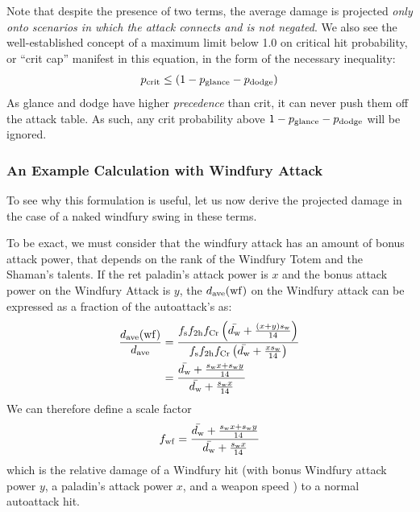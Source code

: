 Note that despite the presence of two \pdodge terms, the average damage is projected \emph{only onto scenarios in which the attack connects and is not negated}.
We also see the well-established concept of a maximum limit below 1.0 on critical hit probability, or ``crit cap'' manifest in this equation, in the form of the necessary inequality:
\begin{equation}
	p_{\mathrm{crit}}  \leq (1-p_{\mathrm{glance}}  - p_{\mathrm{dodge}} )
\end{equation}
As glance and dodge have higher \emph{precedence} than crit, it can never push them off the attack table.
As such, any crit probability above $1 - p_{\mathrm{glance}}  - p_{\mathrm{dodge}} $ will be ignored.

\subsubsection{An Example Calculation with Windfury Attack}
To see why this formulation is useful, let us now derive the projected damage in the case of a naked windfury swing in these terms.

To be exact, we must consider that the windfury attack has an amount of bonus attack power, that depends on the rank of the Windfury Totem and the Shaman's talents.
If the ret paladin's attack power is $x$ and the bonus attack power on the Windfury Attack is $y$, the $d_{\mathrm{ave}} (\mathrm{wf})$ on the Windfury attack can be expressed as a fraction of the autoattack's \dave as:
\begin{equation*}
	\begin{aligned}
		\frac{d_{\mathrm{ave}} (\mathrm{wf})}{d_{\mathrm{ave}} } &= \frac{f_{\mathrm{s}}  f_{\mathrm{2h}}  f_{\mathrm{Cr}}  \left( \bar{d_\mathrm{w}}  + \frac{(x+y)s_\mathrm{w} }{14} \right)}{f_{\mathrm{s}}  f_{\mathrm{2h}}  f_{\mathrm{Cr}}  \left( \bar{d_\mathrm{w} } + \frac{xs_\mathrm{w} }{14} \right)} \\
		&= \frac{\bar{d_\mathrm{w}}  + \frac{s_\mathrm{w}  x + s_\mathrm{w}  y}{14}}{\bar{d_\mathrm{w}}  + \frac{s_\mathrm{w}  x}{14}}
	\end{aligned}
\end{equation*}
We can therefore define a scale factor
\begin{equation}
	f_{\mathrm{wf}}  = \frac{\bar{d_\mathrm{w}}  + \frac{s_\mathrm{w}  x + s_\mathrm{w}  y}{14}}{\bar{d_\mathrm{w}}  + \frac{s_\mathrm{w}  x}{14}}
\end{equation}
which is the relative damage of a Windfury hit (with bonus Windfury attack power $y$, a paladin's attack power $x$, and a weapon speed \ws) to a normal autoattack hit.

